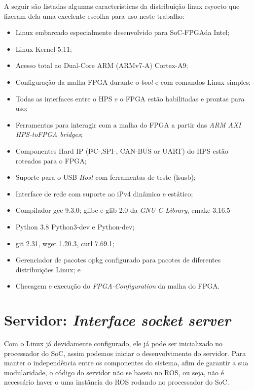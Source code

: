 A seguir são listadas algumas características da distribuição linux rsyocto que fizeram dela uma excelente escolha para uso neste trabalho:
\begin{itemize}
	\item Linux embarcado especialmente desenvolvido para SoC-FPGAda Intel;
	\item Linux Kernel 5.11;
	\item Acesso total ao Dual-Core ARM (ARMv7-A) Cortex-A9;
	\item Configuração da malha FPGA durante o \textit{boot} e com comandos Linux simples;
	\item Todas as interfaces entre o HPS e o FPGA estão habilitadas e prontas para uso;
	\item Ferramentas para interagir com a malha do FPGA a partir das \textit{ARM AXI HPS-toFPGA bridges};
	\item Componentes Hard IP (I²C-,SPI-, CAN-BUS or UART) do HPS estão roteados para o FPGA\@;
	\item Suporte para o USB \textit{Host} com ferramentas de teste (lsusb);
	\item Interface de rede com suporte ao iPv4 dinâmico e estático;
	\item Compilador gcc 9.3.0; glibc e glib-2.0 da \textit{GNU C Library}, cmake 3.16.5
	\item Python 3.8 Python3-dev e Python-dev;
	\item git 2.31, wget 1.20.3, curl 7.69.1; 
	\item Gerenciador de pacotes opkg configurado para pacotes de diferentes distribuições Linux; e
	\item Checagem e execução do \textit{FPGA-Configuration} da malha do FPGA\@.
	\end{itemize}

\section{Servidor: \textit{Interface socket server}}

Com o Linux já devidamente configurado, ele já pode ser inicializado no processador do SoC, assim podemos iniciar o desenvolvimento do servidor. Para manter o independência entre os componentes do sistema, afim de garantir a sua modularidade, o código do servidor não se baseia no ROS\@, ou seja, não é necessário haver o uma instância do ROS rodando no processador do SoC\@. 

